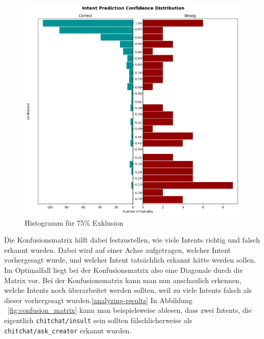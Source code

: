 \begin{figure}[hbt!]
    \centering
    \includegraphics[scale=0.5]{pics/intent_histogram_75}
    \caption{Histogramm für 75\% Exklusion}
    \label{fig:histogram_75}
\end{figure}

Die Konfusionsmatrix hilft dabei festzustellen, wie viele Intents richtig und falsch erkannt wurden.
Dabei wird auf einer Achse aufgetragen, welcher Intent vorhergesagt wurde, und welcher Intent tatsächlich erkannt hätte werden sollen.
Im Optimalfall liegt bei der Konfusionsmatrix also eine Diagonale durch die Matrix vor.
Bei der Konfusionsmatrix kann man nun anschaulich erkennen, welche Intents noch überarbeitet werden sollten, weil zu viele Intents falsch als dieser vorhergesagt wurden.\ref{analyzing-results}
In Abbildung ~\ref{fig:confusion_matrix} kann man beispielsweise ablesen, dass zwei Intents, die eigentlich \texttt{chitchat/insult} sein sollten fälschlicherweise als \texttt{chitchat/ask\_creator} erkannt wurden.

